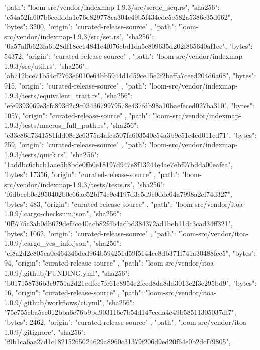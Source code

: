{    {
      "path": "loom-src/vendor/indexmap-1.9.3/src/serde_seq.rs",
      "sha256": "c54a52fa607b6ccddda1e76e829778ca304c49b5f434edc5e582a5386c35d662",
      "bytes": 3200,
      "origin": "curated-release-source"
    },
    {
      "path": "loom-src/vendor/indexmap-1.9.3/src/set.rs",
      "sha256": "0a57affb623fa6b28df18cc14841e4f076cbd1da5c809635d202f865640af1ee",
      "bytes": 54372,
      "origin": "curated-release-source"
    },
    {
      "path": "loom-src/vendor/indexmap-1.9.3/src/util.rs",
      "sha256": "ab712bce71b54cf2763e6010e64bb5944d1d59ce15e2f2beffa7ceed204d6a68",
      "bytes": 915,
      "origin": "curated-release-source"
    },
    {
      "path": "loom-src/vendor/indexmap-1.9.3/tests/equivalent_trait.rs",
      "sha256": "efe9393069e3cfc893d2c9c0343679979578e437fdb98a10baefeced027ba310",
      "bytes": 1057,
      "origin": "curated-release-source"
    },
    {
      "path": "loom-src/vendor/indexmap-1.9.3/tests/macros_full_path.rs",
      "sha256": "c33c86d7341581fdd08e2e6375a4afca507fa603540c54a3b9e51c4cd011cd71",
      "bytes": 259,
      "origin": "curated-release-source"
    },
    {
      "path": "loom-src/vendor/indexmap-1.9.3/tests/quick.rs",
      "sha256": "1addbc6cbcb1aae5b8bde0fb0e18197d947e8f13244e4ae7ebf97bdda00eafea",
      "bytes": 17356,
      "origin": "curated-release-source"
    },
    {
      "path": "loom-src/vendor/indexmap-1.9.3/tests/tests.rs",
      "sha256": "f6dbeeb0e2950402b0e66ac52bf74c9e4197d3c5d9c0dde64a7998a2ef74d327",
      "bytes": 483,
      "origin": "curated-release-source"
    },
    {
      "path": "loom-src/vendor/itoa-1.0.9/.cargo-checksum.json",
      "sha256": "0f5775c3ab0db629def7cc40acb82fdb4adbd384372ad1beb11dc3cad34ff321",
      "bytes": 1062,
      "origin": "curated-release-source"
    },
    {
      "path": "loom-src/vendor/itoa-1.0.9/.cargo_vcs_info.json",
      "sha256": "cf8a2d2c805ca0e464346ded964b594251d59f5144cc8db371f741a30488fec5",
      "bytes": 94,
      "origin": "curated-release-source"
    },
    {
      "path": "loom-src/vendor/itoa-1.0.9/.github/FUNDING.yml",
      "sha256": "b017158736b3c9751a2d21edfce7fe61c8954e2fced8da8dd3013c2f3e295bd9",
      "bytes": 16,
      "origin": "curated-release-source"
    },
    {
      "path": "loom-src/vendor/itoa-1.0.9/.github/workflows/ci.yml",
      "sha256": "75c755cba5ce012bba6c76b9bd903116e7b54d147eeda4c49b58511305037df7",
      "bytes": 2462,
      "origin": "curated-release-source"
    },
    {
      "path": "loom-src/vendor/itoa-1.0.9/.gitignore",
      "sha256": "f9b1ca6ae27d1c18215265024629a8960c31379f206d9ed20f64e0b2dcf79805",
}}
